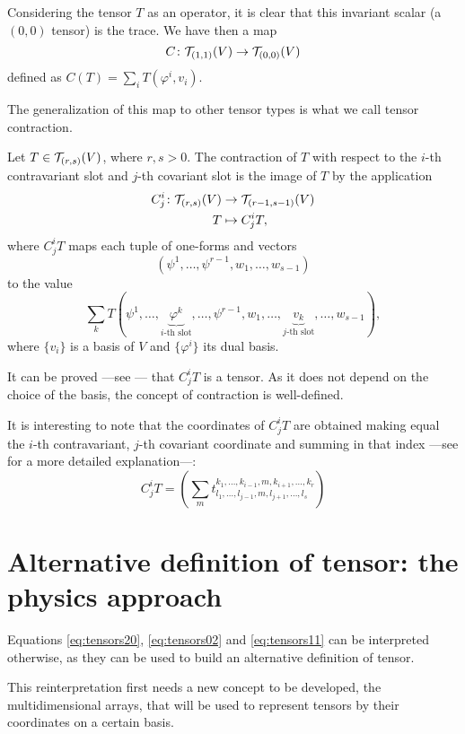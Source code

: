 Considering the tensor $T$ as an operator, it is clear that this invariant scalar (a $(0,0)$ tensor) is the trace. We have then a map
\[
	C \colon {\mathcal T}_{(1,1)}(V) \to {\mathcal T}_{(0,0)}(V)
\]
defined as $C(T) = \sum_i T(\varphi^i, v_i)$.

The generalization of this map to other tensor types is what we call tensor contraction.

\begin{definition}
	Let $T \in {\mathcal T}_{(r,s)}(V)$, where $r,s > 0$. The contraction of $T$ with respect to the $i$-th contravariant slot and $j$-th covariant slot is the image of $T$ by the application
	\begin{align*}
		C^i_j \colon {\mathcal T}_{(r,s)}(V) &\to {\mathcal T}_{(r-1,s-1)}(V) \\
		T &\mapsto C^i_j T,
	\end{align*}
	where $C^i_j T$ maps each tuple of one-forms and vectors 
	\[
		(\psi^1, \dots, \psi^{r-1}, w_1, \dots, w_{s-1})
	\]
	to the value
	\[
		\sum_k T(\psi^1, \dots, \underbrace{\varphi^k}_{i\textrm{-th slot}}, \dots, \psi^{r-1}, w_1, \dots, \underbrace{v_k}_{j\textrm{-th slot}}, \dots, w_{s-1}),
	\]
	where $\{v_i\}$ is a basis of $V$ and $\{\varphi^i\}$ its dual basis.
\end{definition}

It can be proved ---see \cite[Prop. 6.12]{romero86}--- that $C^i_j T$ is a tensor. As it does not depend on the choice of the basis, the concept of contraction is well-defined.

It is interesting to note that the coordinates of $C^i_j T$ are obtained making equal the $i$-th contravariant, $j$-th covariant coordinate and summing in that index ---see \cite[Prop. 6.14]{romero86} for a more detailed explanation---:
\[
	C^i_j T = \left( \sum_m t^{k_1, \dots, k_{i-1}, m, k_{i+1}, \dots, k_r}_{l_1, \dots, l_{j-1}, m, l_{j+1}, \dots, l_s} \right)
\]


\section{Alternative definition of tensor: the physics approach}

Equations \ref{eq:tensors20}, \ref{eq:tensors02} and \ref{eq:tensors11} can be interpreted otherwise, as they can be used to build an alternative definition of tensor.

This reinterpretation first needs a new concept to be developed, the multidimensional arrays, that will be used to represent tensors by their coordinates on a certain basis.


